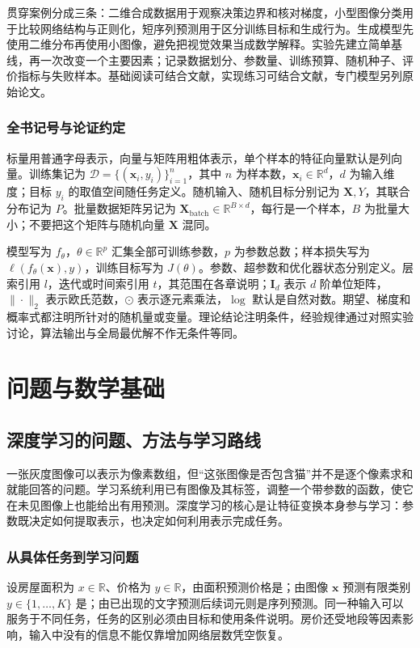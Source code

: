 \documentclass[UTF8,12pt,a4paper,fontset=fandol]{ctexbook}
\begin{document}
贯穿案例分成三条：二维合成数据用于观察决策边界和核对梯度，小型图像分类用于比较网络结构与正则化，短序列预测用于区分训练目标和生成行为。生成模型先使用二维分布再使用小图像，避免把视觉效果当成数学解释。实验先建立简单基线，再一次改变一个主要因素；记录数据划分、参数量、训练预算、随机种子、评价指标与失败样本。基础阅读可结合文献\cite{goodfellow2016}，实现练习可结合文献\cite{d2l}，专门模型另列原始论文。

\section*{全书记号与论证约定}
标量用普通字母表示，向量与矩阵用粗体表示，单个样本的特征向量默认是列向量。训练集记为 $\mathcal D=\{(\mathbf x_i,y_i)\}_{i=1}^{n}$，其中 $n$ 为样本数，$\mathbf x_i\in\mathbb R^d$，$d$ 为输入维度；目标 $y_i$ 的取值空间随任务定义。随机输入、随机目标分别记为 $\mathbf X,Y$，其联合分布记为 $P$。批量数据矩阵另记为 $\mathbf X_{\mathrm{batch}}\in\mathbb R^{B\times d}$，每行是一个样本，$B$ 为批量大小；不要把这个矩阵与随机向量 $\mathbf X$ 混同。

模型写为 $f_\theta$，$\theta\in\mathbb R^p$ 汇集全部可训练参数，$p$ 为参数总数；样本损失写为 $\ell(f_\theta(\mathbf x),y)$，训练目标写为 $J(\theta)$。参数、超参数和优化器状态分别定义。层索引用 $l$，迭代或时间索引用 $t$，其范围在各章说明；$\mathbf I_d$ 表示 $d$ 阶单位矩阵，$\|\cdot\|_2$ 表示欧氏范数，$\odot$ 表示逐元素乘法，$\log$ 默认是自然对数。期望、梯度和概率式都注明所针对的随机量或变量。理论结论注明条件，经验规律通过对照实验讨论，算法输出与全局最优解不作无条件等同。

\part{问题与数学基础}

\chapter{深度学习的问题、方法与学习路线}
\label{chap:dl-introduction}
一张灰度图像可以表示为像素数组，但“这张图像是否包含猫”并不是逐个像素求和就能回答的问题。学习系统利用已有图像及其标签，调整一个带参数的函数，使它在未见图像上也能给出有用预测。深度学习的核心是让特征变换本身参与学习：参数既决定如何提取表示，也决定如何利用表示完成任务。

\section{从具体任务到学习问题}
设房屋面积为 $x\in\mathbb R$、价格为 $y\in\mathbb R$，由面积预测价格是；由图像 $\mathbf x$ 预测有限类别 $y\in\{1,\ldots,K\}$ 是；由已出现的文字预测后续词元则是序列预测。同一种输入可以服务于不同任务，任务的区别必须由目标和使用条件说明。房价还受地段等因素影响，输入中没有的信息不能仅靠增加网络层数凭空恢复。
\end{document}
